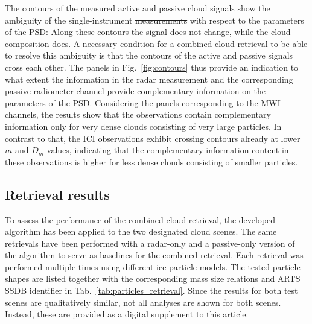 \documentclass[journal abbreviation, manuscript]{copernicus}
\providecommand{\DIFadd}[1]{{\protect\color{blue}\uwave{#1}}} %
\providecommand{\DIFdel}[1]{{\protect\color{red}\sout{#1}}}                      %
\providecommand{\DIFaddbegin}{} %
\providecommand{\DIFaddend}{} %
\providecommand{\DIFdelbegin}{} %
\providecommand{\DIFdelend}{} %
\begin{document}
The contours of \DIFdelbegin \DIFdel{the measured active and passive cloud signals }\DIFdelend \DIFaddbegin \DIFadd{$\Delta T_B$ and $\text{dBZ}_\text{max}$  }\DIFaddend show the ambiguity
of the single-instrument \DIFdelbegin \DIFdel{measurements }\DIFdelend \DIFaddbegin \DIFadd{observations }\DIFaddend with respect to the parameters of the PSD:
Along these contours the signal does not change, while the cloud composition
does. A necessary condition for a combined cloud retrieval to be able to resolve
this ambiguity is that the contours of the active and passive signals cross each
other. The panels in Fig.~\ref{fig:contours} thus provide an indication to what
extent the information in the radar measurement and the corresponding passive
radiometer channel provide complementary information on the parameters of the
PSD. Considering the panels corresponding to the MWI channels, the results show
that the observations contain complementary information only for very dense
clouds consisting of very large particles. In contrast to that, the ICI
observations exhibit crossing contours already at lower $m$ and $D_m$ values,
indicating that the complementary information content in these observations is
higher for less dense clouds consisting of smaller particles.

\subsection{Retrieval results}

To assess the performance of the combined cloud retrieval, the developed
algorithm has been applied to the two designated cloud scenes. The same
retrievals have been performed with a radar-only and a passive-only version of
the algorithm to serve as baselines for the combined retrieval. Each retrieval
was performed multiple times using different ice particle models. The tested
particle shapes are listed together with the corresponding mass size relations
and ARTS SSDB identifier in Tab.~\ref{tab:particles_retrieval}. Since the
results for both test scenes are qualitatively similar, not all analyses are
shown for both scenes. Instead, these are provided as a digital supplement to
this article.
\end{document}
